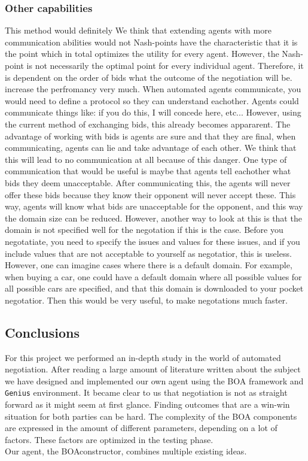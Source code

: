 \subsubsection{Other capabilities}


This method would definitely 
We think that extending agents with more communication abilities would not 
Nash-points have the characteristic that it is the point which in total optimizes the utility for every agent. However, the Nash-point is not necessarily the optimal point for every individual agent. Therefore, it is dependent on the order of bids what the outcome of the negotiation will be. 
increase the perfromancy very much. When automated agents communicate,
you would need to define a protocol so they can understand eachother.
Agents could communicate things like: if you do this, I will concede here, etc...
However, using the current method of exchanging bids, this already becomes 
appararent. The advantage of working with bids is agents are sure and that they are final,
when communicating, agents can lie and take advantage of each other. 
We think that this will lead to no communication at all because of this danger.
One type of communication that would be useful is maybe that agents
tell eachother what bids they deem unacceptable. 
After communicating this, the agents will never offer these bids because they know
their opponent will never accept these. This way, 
agents will know what bids are unacceptable for the opponent, and this way
the domain size can be reduced. 
However, another way to look at this is that the domain is not specified well for the 
negotation if this is the case. Before you negotatiate, you need to specify the issues
and values for these issues, and if you include values that are not acceptable to 
yourself as negotatior, this is useless. However, one can imagine cases where
there is a default domain. For example, when buying a car, one could have a default domain
where all possible values for all possible cars are specified, and that this domain is 
downloaded to your pocket negotatior. Then this would be very useful,
to make negotations much faster.



\subsection{Conclusions}

For this project we performed an in-depth study in the world of automated negotiation. After reading a large amount of literature written about the subject we have designed and implemented our own agent using the BOA framework and \texttt{Genius} environment. It became clear to us that negotiation is not as straight forward as it might seem at first glance. Finding outcomes that are a win-win situation for both parties can be hard. The complexity of the BOA components are expressed in the amount of different parameters, depending on a lot of factors. These factors are optimized in the testing phase.  \\

Our agent, the BOAconstructor, combines multiple existing ideas.


